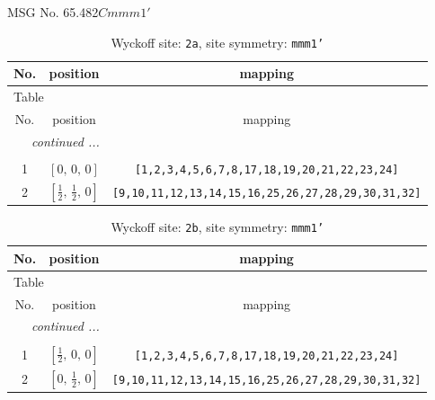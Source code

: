 \documentclass[fleqn,8pt]{jsarticle}
\begin{document}
\setcounter{MaxMatrixCols}{32}

\renewcommand{\tablename}{Table~}
\renewcommand{\figurename}{Figure~}
\begin{center}
\LARGE
MSG No. 65.482\quad$Cmmm1'$
\end{center}
\renewcommand{\arraystretch}{1.2}
\begin{longtable}{ccc}
\caption{Wyckoff site: {\tt 2a}, site symmetry: {\tt mmm1'}}
 \\
 \hline \hline
No. & position & mapping \\ \hline \endfirsthead

\multicolumn{2}{l}{\tablename\ \thetable{}} \\
 \hline \hline
No. & position & mapping \\ \hline \endhead

 \hline \hline
\multicolumn{2}{r}{\footnotesize\it continued ...} \\ \endfoot

 \hline \hline
\multicolumn{2}{r}{} \\ \endlastfoot

1 & $\left[ 0,\, 0,\, 0 \right]$ & {\tt [1,2,3,4,5,6,7,8,17,18,19,20,21,22,23,24]} \\ \hline
2 & $\left[ \frac{1}{2},\, \frac{1}{2},\, 0 \right]$ & {\tt [9,10,11,12,13,14,15,16,25,26,27,28,29,30,31,32]} \\
\end{longtable}
\renewcommand{\arraystretch}{1.2}
\begin{longtable}{ccc}
\caption{Wyckoff site: {\tt 2b}, site symmetry: {\tt mmm1'}}
 \\
 \hline \hline
No. & position & mapping \\ \hline \endfirsthead

\multicolumn{2}{l}{\tablename\ \thetable{}} \\
 \hline \hline
No. & position & mapping \\ \hline \endhead

 \hline \hline
\multicolumn{2}{r}{\footnotesize\it continued ...} \\ \endfoot

 \hline \hline
\multicolumn{2}{r}{} \\ \endlastfoot

1 & $\left[ \frac{1}{2},\, 0,\, 0 \right]$ & {\tt [1,2,3,4,5,6,7,8,17,18,19,20,21,22,23,24]} \\ \hline
2 & $\left[ 0,\, \frac{1}{2},\, 0 \right]$ & {\tt [9,10,11,12,13,14,15,16,25,26,27,28,29,30,31,32]} \\
\end{longtable}
\end{document}
